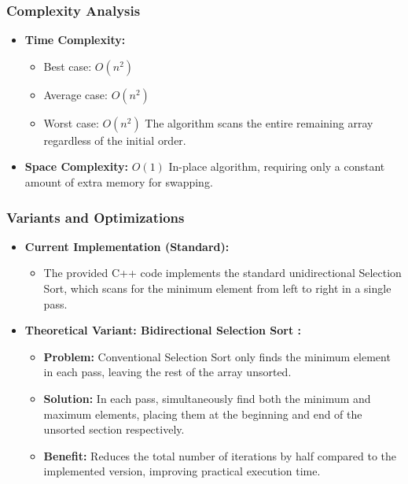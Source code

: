     \subsubsection{Complexity Analysis}
        \begin{itemize}
            \item \textbf{Time Complexity:}
            \begin{itemize}
                \item Best case: $O(n^2)$
                \item Average case: $O(n^2)$
                \item Worst case: $O(n^2)$ 
                    \subitem The algorithm scans the entire remaining array regardless of the initial order.
            \end{itemize}
            \item \textbf{Space Complexity:} $O(1)$ 
                \subitem In-place algorithm, requiring only a constant amount of extra memory for swapping.
        \end{itemize}
   \subsubsection{Variants and Optimizations}
        \begin{itemize}
            \item \textbf{Current Implementation (Standard):} 
            \begin{itemize}
                \item The provided C++ code implements the standard unidirectional Selection Sort, which scans for the minimum element from left to right in a single pass.
            \end{itemize}
            \item \textbf{Theoretical Variant: Bidirectional Selection Sort \cite{alnihoud2010enhancement}:}
            \begin{itemize}
                \item \textbf{Problem:} Conventional Selection Sort only finds the minimum element in each pass, leaving the rest of the array unsorted.
                \item \textbf{Solution:} In each pass, simultaneously find both the minimum and maximum elements, placing them at the beginning and end of the unsorted section respectively.
                \item \textbf{Benefit:} Reduces the total number of iterations by half compared to the implemented version, improving practical execution time.
            \end{itemize}
        \end{itemize}